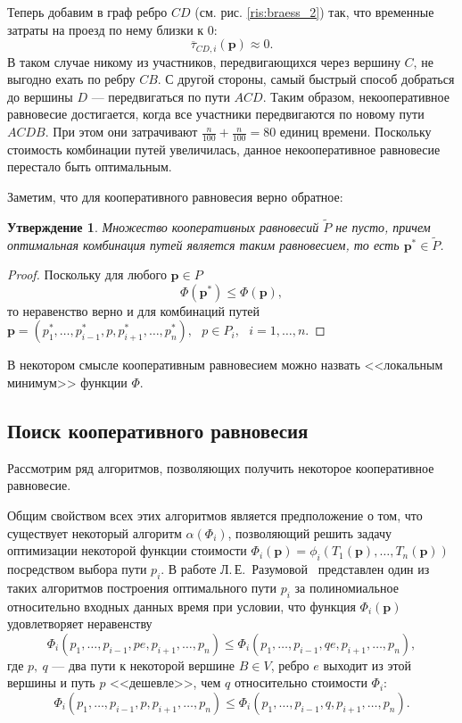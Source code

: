 \documentclass[12pt, a4paper]{article}
\newtheorem{state}{Утверждение}[section]
\begin{document}
Теперь добавим в граф ребро $CD$ (см. рис. \ref{ris:braess_2}) так, что временные затраты на проезд по нему близки к 0:
$$\overline{\tau}_{CD, i} (\textbf{p}) \approx 0.$$
В таком случае никому из участников, передвигающихся через вершину $C$, не выгодно ехать по ребру $CB$. С другой стороны, самый быстрый способ добраться до вершины $D$ --- передвигаться по пути $ACD$. Таким образом, некооперативное равновесие достигается, когда все участники передвигаются по новому пути $ACDB$. При этом они затрачивают $\frac{n}{100} + \frac{n}{100} = 80$ единиц времени. Поскольку стоимость комбинации путей увеличилась, данное некооперативное равновесие перестало быть оптимальным.

Заметим, что для кооперативного равновесия верно обратное:

\begin{state}
Множество кооперативных равновесий $\widetilde{P}$ не пусто, причем
оптимальная комбинация путей является таким равновесием, то есть $\textbf{p}^* \in \widetilde{P}$.
\end{state}

\begin{proof}
	Поскольку для любого $\textbf{p} \in P$ 
	$$\Phi (\textbf{p}^*) \le \Phi (\textbf{p}),$$
	то неравенство верно и для комбинаций путей $\textbf{p} = \left(p^*_1, \ldots, p^*_{i - 1}, p, p^*_{i + 1}, \ldots, p^*_{n} \right), \text{ } p \in P_i, \text{ } i = 1, \ldots, n$.
\end{proof}

В некотором смысле кооперативным равновесием можно назвать <<локальным минимум>> функции $\Phi$.

\subsection{Поиск кооперативного равновесия}
Рассмотрим ряд алгоритмов, позволяющих получить некоторое кооперативное равновесие.

Общим свойством всех этих алгоритмов является предположение о том, что существует некоторый алгоритм $\alpha (\Phi_i)$, позволяющий решить задачу оптимизации некоторой функции стоимости $\Phi_i (\textbf{p}) = \phi_i(T_1(\textbf{p}), \ldots, T_n(\textbf{p}))$ посредством выбора пути $p_i$. В работе Л.\,Е.~Разумовой~\cite{Luba} представлен один из таких алгоритмов построения оптимального пути $p_i$ за полиномиальное относительно входных данных время при условии, что функция $\Phi_i (\textbf{p})$ удовлетворяет неравенству
\begin{equation}
	\label{eq:luba_1}
	\Phi_i (p_1, \ldots, p_{i - 1}, pe, p_{i + 1}, \ldots, p_n) \le 
	\Phi_i (p_1, \ldots, p_{i - 1}, qe, p_{i + 1}, \ldots, p_n),
\end{equation}
где $p, \: q$ --- два пути к некоторой вершине $B \in V$, ребро $e$ выходит из этой вершины и путь $p$ <<дешевле>>, чем $q$ относительно стоимости $\Phi_i$:
\begin{equation}
	\label{eq:luba_2}
	\Phi_i (p_1, \ldots, p_{i - 1}, p, p_{i + 1}, \ldots, p_n) \le
  	\Phi_i (p_1, \ldots, p_{i - 1}, q, p_{i + 1}, \ldots, p_n).
\end{equation}
\end{document}
